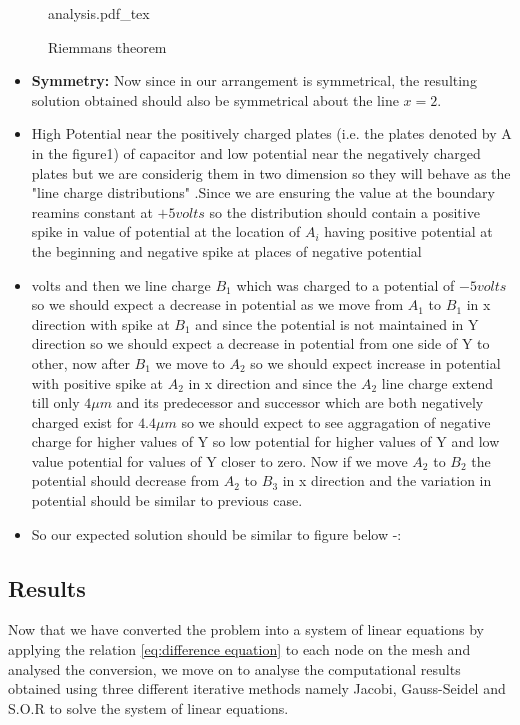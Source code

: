 \begin{figure}[h]
    \centering
    \def\svgwidth{0.6\textwidth}
    {analysis.pdf_tex}
    \caption{Riemmans theorem}
    \label{fig:riemmans-theorem}
\end{figure}
\begin{itemize}
    \item \textbf{Symmetry: } Now since in our arrangement is symmetrical, the resulting solution obtained should also be symmetrical about the line $x = 2$. 
    \item High Potential near the positively charged plates (i.e. the plates denoted by A  in the figure1) of capacitor and low potential near the negatively charged plates but we are considerig them in two dimension so they will behave as the "line charge distributions" .Since we are ensuring the value at the boundary reamins constant at $ +5 volts $ so the distribution should contain a positive spike in value of potential at the location of $A_i$  having positive potential at the beginning and negative spike at places of negative potential
    \item   volts and then we line charge $ B_1$ which was charged to a potential of $ -5 volts $ so we should expect a decrease in potential as we move from $ A_1 $ to $ B_1 $ in x direction with spike at $ B_1 $ and since the potential is not maintained in Y direction so we should expect a decrease in potential from one side of Y to other, now after $ B_1 $ we move to $ A_2 $ so we should expect increase in potential with positive spike at $ A_2 $ in x direction and since the $ A_2 $ line charge extend till only $ 4 \mu m $ and its predecessor and successor which are both negatively charged exist for $ 4.4 \mu m $ so we should expect to see aggragation of negative charge for higher values of Y so low potential for higher values of Y and low value potential for values of Y closer to zero. Now if we move $ A_2 $ to $ B_2 $ the potential should decrease from $ A_2 $ to $ B_3 $ in x direction and the variation in potential should be similar to previous case.
    \item So our expected solution should be similar to figure below -:     
\end{itemize}

\subsection{Results}
Now that we have converted the problem into a system of linear equations by applying the relation \ref{eq:difference equation} to each node on the mesh and analysed the conversion, we move on to analyse the computational results obtained using three different iterative methods namely Jacobi, Gauss-Seidel and S.O.R to solve the system of linear equations.

